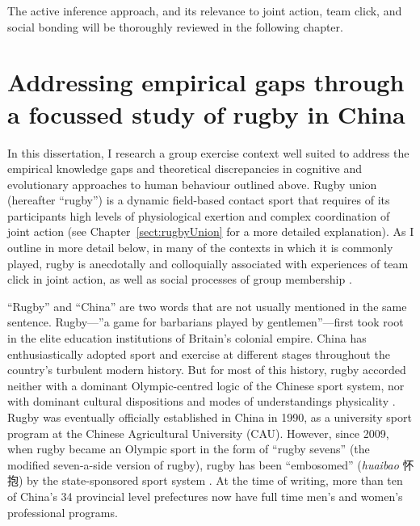 \begin{CJK}{UTF8}{gbsn}
The active inference approach, and its relevance to joint action, team click, and social bonding will be thoroughly reviewed in the following chapter.



\section{Addressing empirical gaps through a focussed study of rugby in China}

In this dissertation, I research a group exercise context well suited to address the empirical knowledge gaps and theoretical discrepancies in cognitive and evolutionary approaches to human behaviour outlined above. Rugby union (hereafter ``rugby'') is a dynamic field-based contact sport that requires of its participants high levels of physiological exertion and complex coordination of joint action  (see Chapter~\ref{sect:rugbyUnion} for a more detailed explanation).  As I outline in more detail below, in many of the contexts in which it is commonly played, rugby is anecdotally and colloquially associated with experiences of team click in joint action, as well as social processes of group membership \citep{Dunning2005}.

``Rugby'' and ``China'' are two words that are not usually mentioned in the same sentence.  Rugby---''a game for barbarians played by gentlemen''---first took root in the elite education institutions of Britain's colonial empire.  China has enthusiastically adopted sport and exercise at different stages throughout the country's turbulent modern history. But for most of this history, rugby accorded neither with a dominant Olympic-centred logic of the Chinese sport system, nor with dominant cultural dispositions and modes of understandings physicality \citep[which derived from hundreds of years of continuous history of Confucian and Daoist traditions of thought, see][]{Morris2004}.  Rugby was eventually officially established in China in 1990, as a university sport program at the Chinese Agricultural University (CAU).  However, since 2009, when rugby became an Olympic sport in the form of ``rugby sevens'' (the modified seven-a-side version of rugby), rugby has been ``embosomed'' (\textit{huaibao} 怀抱) by the state-sponsored sport system \citep{Xu2010}.  At the time of writing, more than ten of China's 34 provincial level prefectures now have full time men's and women's professional programs.


\end{CJK}
